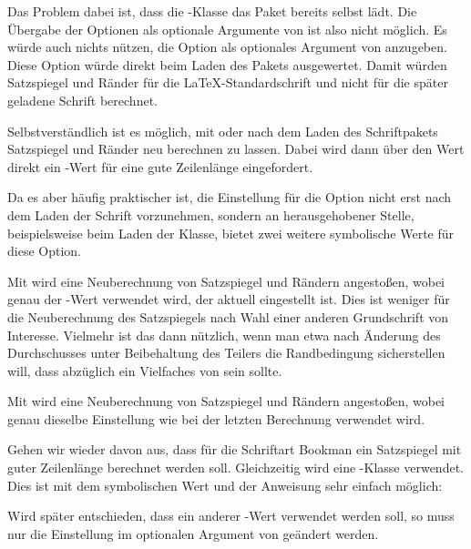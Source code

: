 \begin{Explain}
  Das Problem dabei ist, dass die \KOMAScript-Klasse das Paket
   bereits selbst lädt. Die Übergabe der Optionen als
  optionale Argumente von  ist also nicht
  möglich. Es würde auch nichts nützen, die Option  als
  optionales Argument von 
  anzugeben. Diese Option würde direkt beim Laden des Pakets
   ausgewertet. Damit würden Satzspiegel und Ränder für die
  \LaTeX-Standardschrift und nicht für die später geladene Schrift berechnet.

  Selbstverständlich ist es möglich, mit %
   oder
   nach dem Laden
  des Schriftpakets Satzspiegel und Ränder neu berechnen zu lassen. Dabei wird
  dann über den Wert  direkt ein -Wert für eine gute
  Zeilenlänge eingefordert.

  Da es aber häufig praktischer ist, die Einstellung für die Option
   nicht erst nach dem Laden der Schrift vorzunehmen, sondern an
  herausgehobener Stelle, beispielsweise beim Laden der Klasse, bietet
   zwei weitere symbolische Werte für diese Option.
\end{Explain}

Mit %
 wird eine Neuberechnung von Satzspiegel
und Rändern angestoßen, wobei genau der -Wert verwendet wird, der
aktuell eingestellt ist. Dies ist weniger für die Neuberechnung des
Satzspiegels nach Wahl einer anderen Grundschrift von Interesse. Vielmehr ist
das dann nützlich, wenn man etwa nach Änderung des Durchschusses unter
Beibehaltung des Teilers  die Randbedingung sicherstellen will, dass
 abzüglich  ein Vielfaches von
 sein sollte.

Mit %
 wird eine Neuberechnung von Satzspiegel
und Rändern angestoßen, wobei genau dieselbe Einstellung wie bei der letzten
Berechnung verwendet wird.

\begin{Example}
  Gehen wir wieder davon aus, dass für die Schriftart Bookman ein Satzspiegel
  mit guter Zeilenlänge berechnet werden soll.  Gleichzeitig wird eine
  \KOMAScript-Klasse verwendet. Dies ist mit dem symbolischen Wert
   und der Anweisung  sehr
  einfach möglich:
  Wird später entschieden, dass ein anderer -Wert
  verwendet werden soll, so muss nur die Einstellung im optionalen Argument
  von  geändert werden.
\end{Example}

